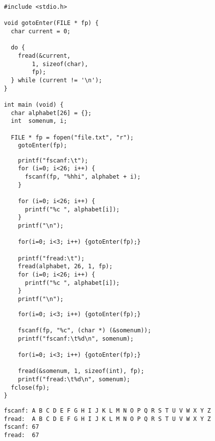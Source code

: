 
\begin{frame}[fragile]
%
%
\begin{codebox}
\begin{verbatim}
#include <stdio.h>

void gotoEnter(FILE * fp) {
  char current = 0;
  
  do {
    fread(&current, 
        1, sizeof(char), 
        fp);
  } while (current != '\n');
}

int main (void) {
  char alphabet[26] = {};
  int  somenum, i;
  
  FILE * fp = fopen("file.txt", "r");
    gotoEnter(fp);
\end{verbatim}
\end{codebox}
%
\begin{codebox}[... Fortsetzung ...]
\begin{verbatim}
    printf("fscanf:\t");
    for (i=0; i<26; i++) {
      fscanf(fp, "%hhi", alphabet + i);
    }
    
    for (i=0; i<26; i++) {
      printf("%c ", alphabet[i]);
    }
    printf("\n");
    
    for(i=0; i<3; i++) {gotoEnter(fp);}
    
    printf("fread:\t");
    fread(alphabet, 26, 1, fp);
    for (i=0; i<26; i++) {
      printf("%c ", alphabet[i]);
    }
    printf("\n");
\end{verbatim}
\end{codebox}
%
\end{frame}


\begin{frame}[fragile]
%
\begin{codebox}[... Fortsetzung]
\begin{verbatim}
    for(i=0; i<3; i++) {gotoEnter(fp);}
    
    fscanf(fp, "%c", (char *) (&somenum));
    printf("fscanf:\t%d\n", somenum);
    
    for(i=0; i<3; i++) {gotoEnter(fp);}
    
    fread(&somenum, 1, sizeof(int), fp);
    printf("fread:\t%d\n", somenum);
  fclose(fp);
}
\end{verbatim}
\end{codebox}
%
\begin{cmdbox}[Ausgabe]
\begin{verbatim}
fscanf: A B C D E F G H I J K L M N O P Q R S T U V W X Y Z 
fread:  A B C D E F G H I J K L M N O P Q R S T U V W X Y Z 
fscanf: 67
fread:  67
\end{verbatim}
\end{cmdbox}
%
\end{frame}

